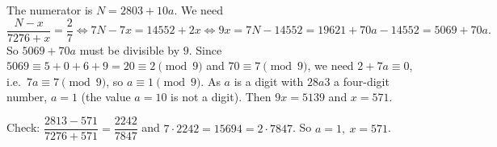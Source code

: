 The numerator is $N=2803+10a$. We need
\[
\dfrac{N-x}{7276+x}=\dfrac{2}{7}\iff 7N-7x=14552+2x\iff 9x=7N-14552=19621+70a-14552=5069+70a .
\]
So $5069+70a$ must be divisible by $9$. Since $5069\equiv5+0+6+9=20\equiv2\pmod 9$ and $70\equiv7\pmod9$, we need $2+7a\equiv0$, i.e.\ $7a\equiv7\pmod9$, so $a\equiv1\pmod9$. As $a$ is a digit with $28a3$ a four-digit number, $a=1$ (the value $a=10$ is not a digit). Then $9x=5139$ and $x=571$.

Check: $\dfrac{2813-571}{7276+571}=\dfrac{2242}{7847}$ and $7\cdot2242=15694=2\cdot7847$. So $\boxed{a=1,\ x=571}$.
